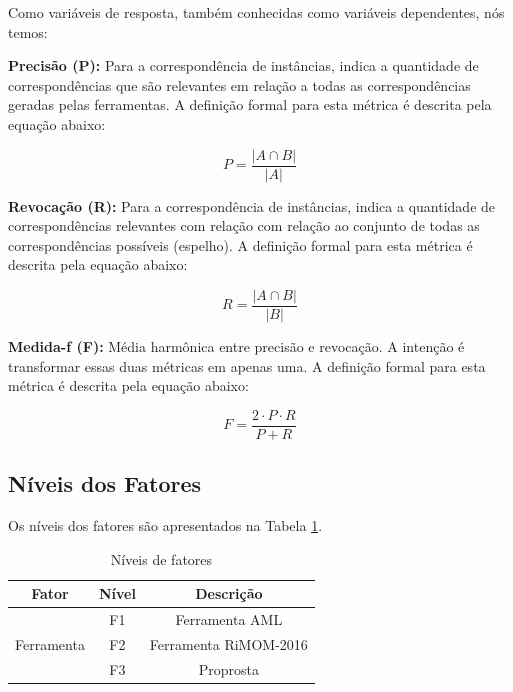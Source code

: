 Como variáveis de resposta, também conhecidas como variáveis dependentes, nós temos:

\textbf{Precisão (P):} Para a correspondência de instâncias, indica a quantidade de correspondências que são relevantes em relação a todas as correspondências geradas pelas ferramentas. A definição formal para esta métrica é descrita pela equação abaixo:

\begin{equation}
P = \dfrac{|{A}\cap{B}|}{|A|}
\end{equation}

\textbf{Revocação (R):} Para a correspondência de instâncias, indica a quantidade de correspondências relevantes com relação com relação ao conjunto de todas as correspondências possíveis (espelho). A definição formal para esta métrica é descrita pela equação abaixo:

\begin{equation}
R = \dfrac{|{A}\cap{B}|}{|B|}
\end{equation}

\textbf{Medida-f (F):} Média harmônica entre precisão e revocação. A intenção é transformar essas duas métricas em apenas uma. A definição formal para esta métrica é descrita pela equação abaixo:

\begin{equation}
F = \dfrac{{2}\cdot{P}\cdot{R}}{P+R}
\end{equation}

\subsection{Níveis dos Fatores}
\label{sub:fator_nivel}
Os níveis dos fatores são apresentados na Tabela \ref{tab:factor_levels}.

\begin{table}[h]
	\centering
	\caption{Níveis de fatores}
	\label{tab:factor_levels}
	\begin{tabular}{|c|c|c|}
		\hline
		\textbf{Fator}        & \textbf{Nível} &  \textbf{Descrição}   \\ \hline
		\multirow{3}{*}{Ferramenta} &       F1       &    Ferramenta AML     \\ \cline{2-3}
		&       F2       & Ferramenta RiMOM-2016 \\ \cline{2-3}
		&       F3       &       Proprosta       \\ \hline
	\end{tabular}
\end{table}

